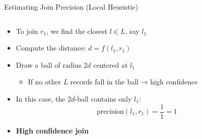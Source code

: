 \documentclass[8pt]{beamer} %
\begin{document}
\begin{frame}{Estimating Join Precision (Local Heuristic)}
\begin{columns}
\begin{column}{0.4\textwidth}
			\small
			\begin{itemize}
				\item To join $r_1$, we find the closest $l \in L$, say $l_1$
				\item Compute the distance: $d = f(l_1, r_1)$
				\item Draw a ball of radius $2d$ centered at $l_1$
				\begin{itemize}
					\item If no other $L$ records fall in the ball → high confidence
				\end{itemize}
				\item In this case, the 2$d$-ball contains only $l_1$:
				\[
				\text{precision}(l_1, r_1) = \frac{1}{1} = 1
				\]
				\item \textbf{High confidence join}
			\end{itemize}
			
		\end{column}
	\end{columns}
\end{frame}
	
\end{document}
